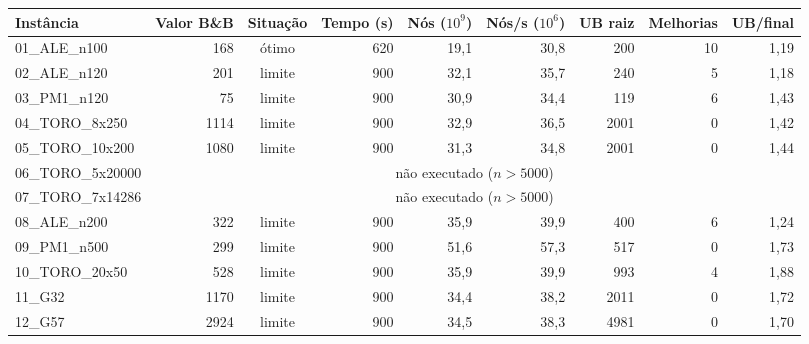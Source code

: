 \begin{tabular}{lrcrrrrrr}\hline
Instância & Valor B\&B & Situação & Tempo (s) & Nós ($10^9$) & Nós/s ($10^6$) & UB raiz & Melhorias & UB/final \\\hline
01\_ALE\_n100 & 168 & ótimo & 620 & 19{,}1 & 30{,}8 & 200 & 10 & 1{,}19 \\
02\_ALE\_n120 & 201 & limite & 900 & 32{,}1 & 35{,}7 & 240 & 5 & 1{,}18 \\
03\_PM1\_n120 & 75 & limite & 900 & 30{,}9 & 34{,}4 & 119 & 6 & 1{,}43 \\
04\_TORO\_8x250 & 1114 & limite & 900 & 32{,}9 & 36{,}5 & 2001 & 0 & 1{,}42 \\
05\_TORO\_10x200 & 1080 & limite & 900 & 31{,}3 & 34{,}8 & 2001 & 0 & 1{,}44 \\
06\_TORO\_5x20000 & \multicolumn{8}{c}{não executado ($n>5000$)} \\
07\_TORO\_7x14286 & \multicolumn{8}{c}{não executado ($n>5000$)} \\
08\_ALE\_n200 & 322 & limite & 900 & 35{,}9 & 39{,}9 & 400 & 6 & 1{,}24 \\
09\_PM1\_n500 & 299 & limite & 900 & 51{,}6 & 57{,}3 & 517 & 0 & 1{,}73 \\
10\_TORO\_20x50 & 528 & limite & 900 & 35{,}9 & 39{,}9 & 993 & 4 & 1{,}88 \\
11\_G32 & 1170 & limite & 900 & 34{,}4 & 38{,}2 & 2011 & 0 & 1{,}72 \\
12\_G57 & 2924 & limite & 900 & 34{,}5 & 38{,}3 & 4981 & 0 & 1{,}70 \\
\hline\end{tabular}
